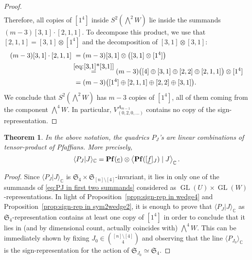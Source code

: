 \documentclass[11pt,reqno]{amsart}
\newtheorem{theorem}{Theorem}
\theoremstyle{definition}
\numberwithin{theorem}{section}
\DeclareMathOperator{\Pf}{\bf Pf}
\DeclareMathOperator{\GL}{GL}
\numberwithin{equation}{section}
\begin{document}
\begin{proof}
\begin{align*}
\end{align*}
Therefore, all copies of $[1^4]$ inside $S^2(\bigwedge^2W)$ lie inside the summands $(m-3)[3,1]\cdot [2,1,1]$. To decompose this product, we use that $[2,1,1]=[3,1]\otimes [1^4]$ and the decomposition of $[3,1]\otimes [3,1]$:
\begin{align*}
(m-3)[3,1]\cdot [2,1,1] & \ = (m-3) [3,1] \otimes \big([3,1] \otimes [1^4] \big) \\
& \stackrel{\eqref{eq:[3,1]*[3,1]}}{=} (m-3)\big( [4] \oplus [3,1] \oplus [2,2] \oplus [2,1,1]\big) \otimes [1^4]\\
& \ = (m-3)\big( [1^4] \oplus [2,1,1] \oplus [2,2] \oplus [3,1] \big) .
\end{align*}
We conclude that $S^2(\bigwedge^2W)$ has $m-3$ copies of $[1^4]$, all of them coming from the component $\bigwedge^4W$. In particular, $V_{(0,2,0,\ldots)}^{A_{m-1}}$ contains no copy of the sign-representation.
\end{proof}

\begin{theorem}\label{thm:Pfaffians}
In the above notation, the quadrics $P_J$'s are linear combinations of tensor-product of Pfaffians. More precisely,
\[ \langle P_J|J\rangle_\mathbb C = \Pf(\underline{e}) \otimes \left\langle \Pf([\underline{f}]_J) \mid J\right\rangle_\mathbb C .\]
\end{theorem}
\begin{proof}
Since $\langle P_J|J\rangle_\mathbb C$ is $\mathfrak{S}_{4}\times \mathfrak{S}_{[n]\setminus [4]}$-invariant, it lies in only one of the summands of \eqref{eq:PJ in first two summands} considered as $\GL(U)\times \GL(W)$-representations. In light of Proposition~\ref{prop:sign-rep in wedge4} and Proposition~\ref{prop:sign-rep in sym2wedge2}, it is enough to prove that $\langle P_J|J\rangle_\mathbb C$ as $\mathfrak{S}_4$-representation contains at least one copy of $[1^4]$ in order to conclude that it lies in (and by dimensional count, actually coincides with) $\bigwedge^4W$. This can be immediately shown by fixing $J_0 \in \binom{[n]\setminus [4]}{4}$ and observing that the line $\langle P_{J_0}\rangle_\mathbb C$ is the sign-representation for the action of $\mathfrak{S}_{J_0}\simeq \mathfrak{S}_4$. 
\end{proof}
\end{document}
